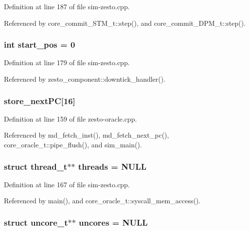 Definition at line 187 of file sim-zesto.cpp.

Referenced by core\_\-commit\_\-STM\_\-t::step(), and core\_\-commit\_\-DPM\_\-t::step().
\subsubsection[{start\_\-pos}]{\setlength{\rightskip}{0pt plus 5cm}int {\bf start\_\-pos} = 0}\label{sim-zesto_8cpp_9715e2df77829e54cb078a298fd6c434}




Definition at line 179 of file sim-zesto.cpp.

Referenced by zesto\_\-component::downtick\_\-handler().
\subsubsection[{store\_\-nextPC}]{ {\bf store\_\-nextPC}[16]}\label{sim-zesto_8cpp_87de3dd0dc95ac44e817dc0f7c7ba3d7}




Definition at line 159 of file zesto-oracle.cpp.

Referenced by md\_\-fetch\_\-inst(), md\_\-fetch\_\-next\_\-pc(), core\_\-oracle\_\-t::pipe\_\-flush(), and sim\_\-main().
\subsubsection[{threads}]{\setlength{\rightskip}{0pt plus 5cm}struct {\bf thread\_\-t}$\ast$$\ast$ {\bf threads} = NULL}\label{sim-zesto_8cpp_f227be61b1f91b71aafae105501d92f7}




Definition at line 167 of file sim-zesto.cpp.

Referenced by main(), and core\_\-oracle\_\-t::syscall\_\-mem\_\-access().
\subsubsection[{uncores}]{\setlength{\rightskip}{0pt plus 5cm}struct {\bf uncore\_\-t}$\ast$$\ast$ {\bf uncores} = NULL}\label{sim-zesto_8cpp_58a16285046a9c04416e306f52015b52}




